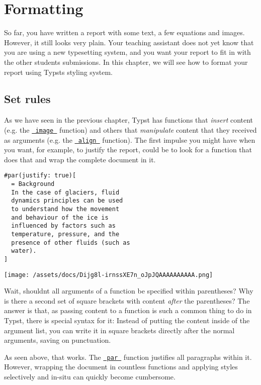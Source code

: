 \section{Formatting}\label{formatting}

So far, you have written a report with some text, a few equations and
images. However, it still looks very plain. Your teaching assistant does
not yet know that you are using a new typesetting system, and you want
your report to fit in with the other student\textquotesingle s
submissions. In this chapter, we will see how to format your report
using Typst\textquotesingle s styling system.

\subsection{Set rules}\label{set-rules}

As we have seen in the previous chapter, Typst has functions that
\emph{insert} content (e.g. the
\href{/docs/reference/visualize/image/}{\texttt{\ image\ }} function)
and others that \emph{manipulate} content that they received as
arguments (e.g. the
\href{/docs/reference/layout/align/}{\texttt{\ align\ }} function). The
first impulse you might have when you want, for example, to justify the
report, could be to look for a function that does that and wrap the
complete document in it.

\begin{verbatim}
#par(justify: true)[
  = Background
  In the case of glaciers, fluid
  dynamics principles can be used
  to understand how the movement
  and behaviour of the ice is
  influenced by factors such as
  temperature, pressure, and the
  presence of other fluids (such as
  water).
]
\end{verbatim}

\texttt{[image: /assets/docs/Dijg8l-irnssXE7n\_oJpJQAAAAAAAAAA.png]}

Wait, shouldn\textquotesingle t all arguments of a function be specified
within parentheses? Why is there a second set of square brackets with
content \emph{after} the parentheses? The answer is that, as passing
content to a function is such a common thing to do in Typst, there is
special syntax for it: Instead of putting the content inside of the
argument list, you can write it in square brackets directly after the
normal arguments, saving on punctuation.

As seen above, that works. The
\href{/docs/reference/model/par/}{\texttt{\ par\ }} function justifies
all paragraphs within it. However, wrapping the document in countless
functions and applying styles selectively and in-situ can quickly become
cumbersome.


